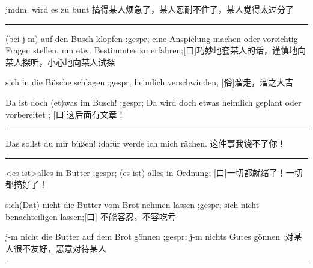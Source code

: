 jmdm. wird es zu bunt 搞得某人烦急了，某人忍耐不住了，某人觉得太过分了

\noindent\rule{\textwidth}{1pt} 
(bei j-m) auf den Busch klopfen ;gespr; eine Anspielung machen oder vorsichtig Fragen stellen, um etw. Bestimmtes zu erfahren;[口]巧妙地套某人的话，谨慎地向某人探听，小心地向某人试探

sich in die Büsche schlagen ;gespr; heimlich verschwinden; [俗]溜走，溜之大吉

Da ist doch (et)was im Busch! ;gespr; Da wird doch etwas heimlich geplant oder vorbereitet ; [口]这后面有文章！

\noindent\rule{\textwidth}{1pt}
Das sollst du mir büßen! ;dafür werde ich mich rächen. 这件事我饶不了你！

\noindent\rule{\textwidth}{1pt} 
\textless es ist\textgreater  alles in Butter ;gespr; (es ist) alles in Ordnung; [口]一切都就绪了！一切都搞好了！

sich(Dat) nicht die Butter vom Brot nehmen lassen ;gespr; sich nicht benachteiligen lassen;[口] 不能容忍，不容吃亏

j-m nicht die Butter auf dem Brot gönnen ;gespr; j-m nichts Gutes gönnen ;对某人很不友好，恶意对待某人

\noindent\rule{\textwidth}{1pt} 
